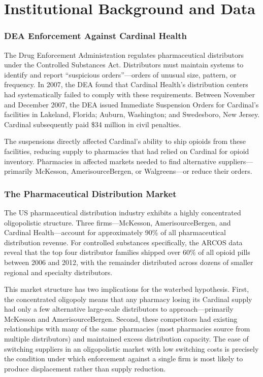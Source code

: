 \documentclass[12pt]{article}
\begin{document}
\section{Institutional Background and Data}

\subsubsection*{DEA Enforcement Against Cardinal Health}
The Drug Enforcement Administration regulates pharmaceutical distributors under the Controlled Substances Act. Distributors must maintain systems to identify and report ``suspicious orders''---orders of unusual size, pattern, or frequency. In 2007, the DEA found that Cardinal Health's distribution centers had systematically failed to comply with these requirements. Between November and December 2007, the DEA issued Immediate Suspension Orders for Cardinal's facilities in Lakeland, Florida; Auburn, Washington; and Swedesboro, New Jersey. Cardinal subsequently paid \$34 million in civil penalties.

The suspensions directly affected Cardinal's ability to ship opioids from these facilities, reducing supply to pharmacies that had relied on Cardinal for opioid inventory. Pharmacies in affected markets needed to find alternative suppliers---primarily McKesson, AmerisourceBergen, or Walgreens---or reduce their orders.

\subsubsection*{The Pharmaceutical Distribution Market}
The US pharmaceutical distribution industry exhibits a highly concentrated oligopolistic structure. Three firms---McKesson, AmerisourceBergen, and Cardinal Health---account for approximately 90\% of all pharmaceutical distribution revenue. For controlled substances specifically, the ARCOS data reveal that the top four distributor families shipped over 60\% of all opioid pills between 2006 and 2012, with the remainder distributed across dozens of smaller regional and specialty distributors.

This market structure has two implications for the waterbed hypothesis. First, the concentrated oligopoly means that any pharmacy losing its Cardinal supply had only a few alternative large-scale distributors to approach---primarily McKesson and AmerisourceBergen. Second, these competitors had existing relationships with many of the same pharmacies (most pharmacies source from multiple distributors) and maintained excess distribution capacity. The ease of switching suppliers in an oligopolistic market with low switching costs is precisely the condition under which enforcement against a single firm is most likely to produce displacement rather than supply reduction.
\end{document}
